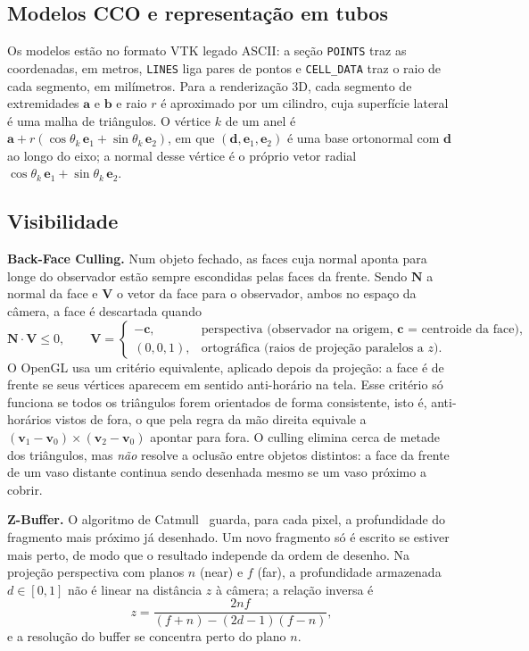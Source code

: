 \documentclass[11pt, a4paper]{article}
\newcommand{\vetor}[1]{\mathbf{#1}}
\begin{document}
\subsection{Modelos CCO e representação em tubos}
Os modelos estão no formato VTK legado ASCII: a seção \texttt{POINTS} traz as coordenadas, em metros, \texttt{LINES} liga pares de pontos e \texttt{CELL\_DATA} traz o raio de cada segmento, em milímetros. Para a renderização 3D, cada segmento de extremidades $\vetor{a}$ e $\vetor{b}$ e raio $r$ é aproximado por um cilindro, cuja superfície lateral é uma malha de triângulos. O vértice $k$ de um anel é $\vetor{a} + r(\cos\theta_k\,\vetor{e}_1 + \sin\theta_k\,\vetor{e}_2)$, em que $(\vetor{d}, \vetor{e}_1, \vetor{e}_2)$ é uma base ortonormal com $\vetor{d}$ ao longo do eixo; a normal desse vértice é o próprio vetor radial $\cos\theta_k\,\vetor{e}_1 + \sin\theta_k\,\vetor{e}_2$.

\subsection{Visibilidade}
\textbf{Back-Face Culling.} Num objeto fechado, as faces cuja normal aponta para longe do observador estão sempre escondidas pelas faces da frente. Sendo $\vetor{N}$ a normal da face e $\vetor{V}$ o vetor da face para o observador, ambos no espaço da câmera, a face é descartada quando
\begin{equation}
  \vetor{N} \cdot \vetor{V} \le 0, \qquad
  \vetor{V} = \begin{cases} -\vetor{c}, & \text{perspectiva (observador na origem, } \vetor{c} \text{ = centroide da face)},\\ (0, 0, 1), & \text{ortográfica (raios de projeção paralelos a } z\text{)}. \end{cases}
\end{equation}
O OpenGL usa um critério equivalente, aplicado depois da projeção: a face é de frente se seus vértices aparecem em sentido anti-horário na tela. Esse critério só funciona se todos os triângulos forem orientados de forma consistente, isto é, anti-horários vistos de fora, o que pela regra da mão direita equivale a $(\vetor{v}_1 - \vetor{v}_0) \times (\vetor{v}_2 - \vetor{v}_0)$ apontar para fora. O culling elimina cerca de metade dos triângulos, mas \emph{não} resolve a oclusão entre objetos distintos: a face da frente de um vaso distante continua sendo desenhada mesmo se um vaso próximo a cobrir.

\textbf{Z-Buffer.} O algoritmo de Catmull~\cite{catmull1974, foley1990} guarda, para cada pixel, a profundidade do fragmento mais próximo já desenhado. Um novo fragmento só é escrito se estiver mais perto, de modo que o resultado independe da ordem de desenho. Na projeção perspectiva com planos $n$ (near) e $f$ (far), a profundidade armazenada $d \in [0, 1]$ não é linear na distância $z$ à câmera; a relação inversa é
\begin{equation}
  z = \frac{2 n f}{(f + n) - (2d - 1)(f - n)},
  \label{eq:linear}
\end{equation}
e a resolução do buffer se concentra perto do plano $n$.
\end{document}

